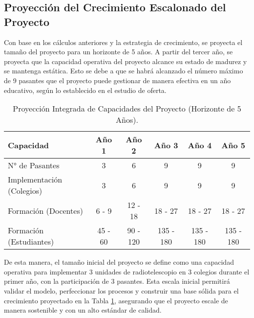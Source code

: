 \subsection*{Proyección del Crecimiento Escalonado del Proyecto}
Con base en los cálculos anteriores y la estrategia de crecimiento, se proyecta el tamaño del proyecto para un horizonte de 5 años. A partir del tercer año, se proyecta que la capacidad operativa del proyecto alcance su estado de madurez y se mantenga estática. Esto se debe a que se habrá alcanzado el número máximo de 9 pasantes que el proyecto puede gestionar de manera efectiva en un año educativo, según lo establecido en el estudio de oferta.

\begin{table}[H]
\centering
\caption{Proyección Integrada de Capacidades del Proyecto (Horizonte de 5 Años).}
\label{tab:proyeccion_integrada}
\begin{tabular}{|l|c|c|c|c|c|}
\hline
\textbf{Capacidad} & \textbf{Año 1} & \textbf{Año 2} & \textbf{Año 3} & \textbf{Año 4} & \textbf{Año 5} \\ \hline
\hline
N° de Pasantes & 3 & 6 & 9 & 9 & 9 \\ \hline
Implementación (Colegios) & 3 & 6 & 9 & 9 & 9 \\ \hline
Formación (Docentes) & 6 - 9 & 12 - 18 & 18 - 27 & 18 - 27 & 18 - 27 \\ \hline
Formación (Estudiantes) & 45 - 60 & 90 - 120 & 135 - 180 & 135 - 180 & 135 - 180 \\ \hline
\end{tabular}
\end{table}

De esta manera, el tamaño inicial del proyecto se define como una capacidad operativa para implementar 3 unidades de radiotelescopio en 3 colegios durante el primer año, con la participación de 3 pasantes. Esta escala inicial permitirá validar el modelo, perfeccionar los procesos y construir una base sólida para el crecimiento proyectado en la Tabla \ref{tab:proyeccion_integrada}, asegurando que el proyecto escale de manera sostenible y con un alto estándar de calidad.

